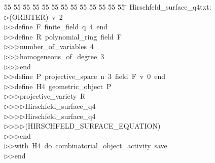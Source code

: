 %
%
\begin{tabbing}
55 \= 55 \= 55 \= 55 \= 55 \= 55 \= 55 \= 55 \= 55 \= 55 \= 55 \= 55 \= 55 \= \kill
Hirschfeld\_surface\_q4txt:\\[0pt]
$\triangleright$\>(ORBITER)\ v\ 2\ \\[0pt]
$\triangleright$\>$\triangleright$\>define\ F\ finite\_field\ q\ 4\ end\ \\[0pt]
$\triangleright$\>$\triangleright$\>define\ R\ polynomial\_ring\ field\ F\ \\[0pt]
$\triangleright$\>$\triangleright$\>$\triangleright$\>number\_of\_variables\ 4\ \\[0pt]
$\triangleright$\>$\triangleright$\>$\triangleright$\>homogeneous\_of\_degree\ 3\ \\[0pt]
$\triangleright$\>$\triangleright$\>$\triangleright$\>end\ \\[0pt]
$\triangleright$\>$\triangleright$\>define\ P\ projective\_space\ n\ 3\ field\ F\ v\ 0\ end\ \\[0pt]
$\triangleright$\>$\triangleright$\>define\ H4\ geometric\_object\ P\ \\[0pt]
$\triangleright$\>$\triangleright$\>$\triangleright$\>projective\_variety\ R\ \\[0pt]
$\triangleright$\>$\triangleright$\>$\triangleright$\>$\triangleright$\>Hirschfeld\_surface\_q4\ \\[0pt]
$\triangleright$\>$\triangleright$\>$\triangleright$\>$\triangleright$\>Hirschfeld\_surface\_q4\ \\[0pt]
$\triangleright$\>$\triangleright$\>$\triangleright$\>$\triangleright$\>(HIRSCHFELD\_SURFACE\_EQUATION)\ \\[0pt]
$\triangleright$\>$\triangleright$\>$\triangleright$\>end\ \\[0pt]
$\triangleright$\>$\triangleright$\>with\ H4\ do\ combinatorial\_object\_activity\ save\ \\[0pt]
$\triangleright$\>$\triangleright$\>end\\[0pt]
\end{tabbing}
